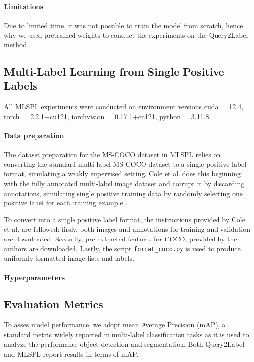 \documentclass[lettersize,journal]{IEEEtran}
\begin{document}
\paragraph{Limitations}
Due to limited time, it was not possible to train the model from scratch, hence why we used pretrained weights to conduct the experiments on the Query2Label method.


\subsection{Multi-Label Learning from Single Positive Labels}
All MLSPL experiments were conducted on environment versions cuda==12.4, torch==2.2.1+cu121, torchvision==0.17.1+cu121, python==3.11.8.
\paragraph{Data preparation}
The dataset preparation for the MS-COCO dataset in MLSPL relies on converting the standard multi-label MS-COCO dataset to a single positive label format, simulating a weakly supervised setting. Cole et al. does this beginning with the fully annotated multi-label image dataset and corrupt it by discarding annotations, simulating single positive training data by randomly selecting one positive label for each training example \cite{mlsp}.

To convert into a single positive label format, the instructions provided by Cole et al. are followed: firsly, both images and annotations for training and validation are downloaded. Secondly, pre-extracted features for COCO, provided by the authors are downloaded. Lastly, the script \texttt{format\_coco.py} is used to produce uniformly formatted image lists and labels.

\paragraph{Hyperparameters}

\subsection{Evaluation Metrics}
To asses model performance, we adopt mean Average Precision (mAP), a standard metric widely reported in multi-label classification tasks as it is used to analyze the performance object detection and segmentation. Both Query2Label and MLSPL report results in terms of mAP. 
\end{document}
